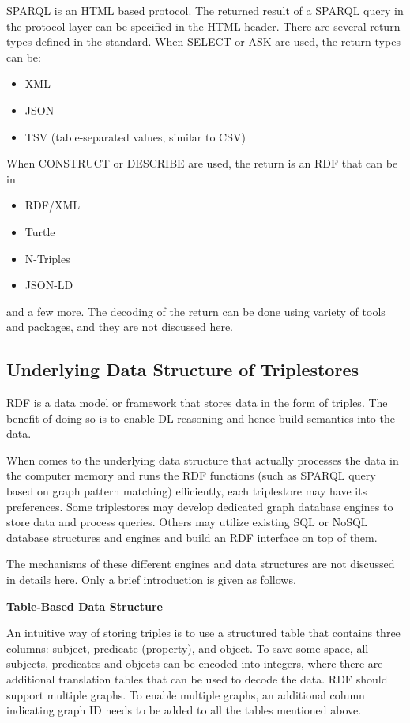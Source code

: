 SPARQL is an HTML based protocol. The returned result of a SPARQL query in the protocol layer can be specified in the HTML header. There are several return types defined in the standard. When SELECT or ASK are used, the return types can be:
\begin{itemize}
	\item XML
	\item JSON
	\item TSV (table-separated values, similar to CSV)
\end{itemize}
When CONSTRUCT or DESCRIBE are used, the return is an RDF that can be in
\begin{itemize}
	\item RDF/XML
	\item Turtle
	\item N-Triples
	\item JSON-LD
\end{itemize}
and a few more. The decoding of the return can be done using variety of tools and packages, and they are not discussed here.

\subsection{Underlying Data Structure of Triplestores}

RDF is a data model or framework that stores data in the form of triples. The benefit of doing so is to enable DL reasoning and hence build semantics into the data. 

When comes to the underlying data structure that actually processes the data in the computer memory and runs the RDF functions (such as SPARQL query based on graph pattern matching) efficiently, each triplestore may have its preferences. Some triplestores may develop dedicated graph database engines to store data and process queries. Others may utilize existing SQL or NoSQL database structures and engines and build an RDF interface on top of them.

The mechanisms of these different engines and data structures are not discussed in details here. Only a brief introduction is given as follows.

\vspace{0.1in}
\noindent \textbf{Table-Based Data Structure}
\vspace{0.1in}

An intuitive way of storing triples is to use a structured table that contains three columns: subject, predicate (property), and object. To save some space, all subjects, predicates and objects can be encoded into integers, where there are additional translation tables that can be used to decode the data. RDF should support multiple graphs. To enable multiple graphs, an additional column indicating graph ID needs to be added to all the tables mentioned above.

